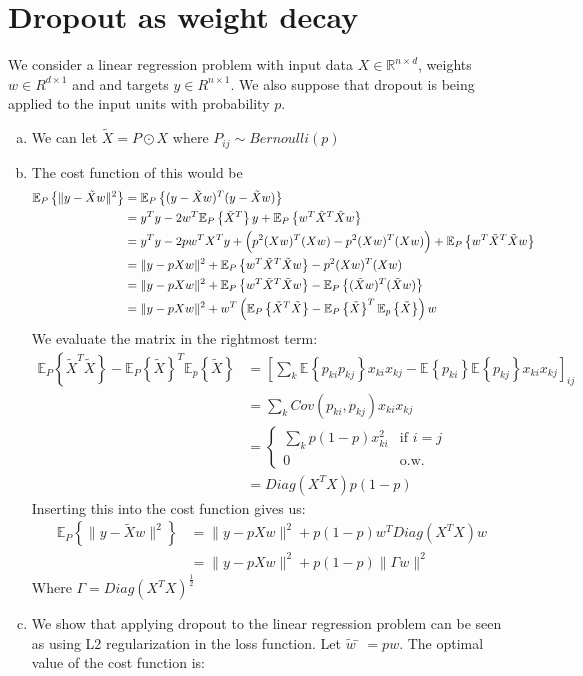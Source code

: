 \documentclass[paper=a4, fontsize=11pt]{scrartcl} %
\numberwithin{equation}{section} %
\numberwithin{figure}{section} %
\numberwithin{table}{section} %
\newcommand{\Ex}[2]{\mathbb{E}_{#1}\left\{#2\right\}}
\begin{document}
\section{Dropout as weight decay}
	We consider a linear regression problem with input data $X\in\mathbb{R}^{n\times d}$, weights $w\in R^{d\times1}$ and
	and targets $y\in R^{n\times1}$. We also suppose that dropout is being applied to the input units with probability $p$.
\begin{enumerate}[(a)]
	\item We can let $\tilde{X}=P\odot X$ where $P_{ij}\sim Bernoulli(p)$
	\item The cost function of this would be
	\begin{align*}
	\Ex{P}{\| y-\tilde{X}w\|^2} &= \Ex{P}{(y-\tilde{X}w)^T(y-\tilde{X}w) } \\
	&= y^Ty-2w^T\Ex{P}{\tilde{X}^T}y+\Ex{P}{w^T\tilde{X}^T\tilde{X}w}\\
	&= y^Ty-2pw^TX^Ty+ \Bigl( p^2 (Xw)^T(Xw) - p^2 (Xw)^T(Xw) \Bigr) + \Ex{P}{w^T\tilde{X}^T\tilde{X}w}\\
	&= \| y-pXw\|^2 + \Ex{P}{w^T\tilde{X}^T\tilde{X}w} - p^2 (Xw)^T(Xw)\\
	&= \| y-pXw\|^2 + \Ex{P}{w^T\tilde{X}^T\tilde{X}w} - \Ex{P}{(\tilde{X}w)^T(\tilde{X}w)}\\
	&= \| y-pXw\|^2 + w^T\left(\Ex{P}{\tilde{X}^T\tilde{X}} - \Ex{P}{\tilde{X}}^T\Ex{p}{\tilde{X}}\right)w
	\end{align*}
	We evaluate the matrix in the rightmost term:
	\begin{align*}
	\Ex{P}{\tilde{X}^T\tilde{X}} - \Ex{P}{\tilde{X}}^T\Ex{p}{\tilde{X}} &= \left[ \sum_k \Ex{}{p_{ki}p_{kj}}x_{ki}x_{kj}-\Ex{}{p_{ki}}\Ex{}{p_{kj}}x_{ki}x_{kj} \right]_{ij}\\
	&= \sum_k Cov(p_{ki},p_{kj})x_{ki}x_{kj}\\
	&=
	\begin{cases}
	\sum_k p(1-p)x_{ki}^2
	& \text{if $i=j$}\\
	0 & \text{o.w.}
	\end{cases}\\
	&= Diag(X^TX)p(1-p)
	\end{align*}
	Inserting this into the cost function gives us:
	\begin{align*}
	\Ex{P}{\| y-\tilde{X}w\|^2} &= \| y-pXw\|^2 + p(1-p) w^TDiag(X^TX)w\\
	&= \| y-pXw\|^2 + p(1-p) \|\Gamma w\|^2
	\end{align*}
	Where $\Gamma = Diag(X^TX)^{\frac{1}{2}}$
	\item We show that applying dropout to the linear regression problem can be seen as using L2 regularization in the loss function. Let $\tilde{w}̄=pw$. The optimal value of the cost function is:

\end{enumerate}
\end{document}
